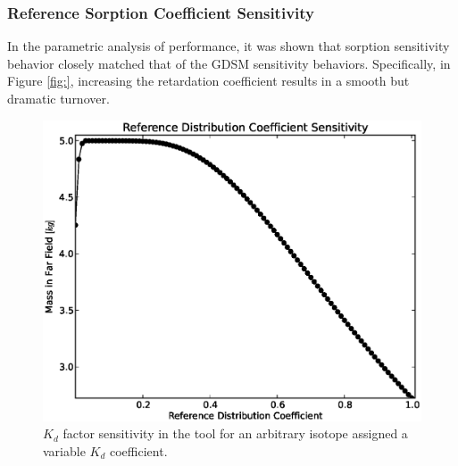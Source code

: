 
\subsubsection{Reference Sorption Coefficient Sensitivity}

In the parametric analysis of \Cyder performance, it was shown that sorption 
sensitivity behavior closely matched that of the \gls{GDSM} sensitivity 
behaviors. Specifically, in Figure \ref{fig:}, increasing the retardation 
coefficient results in a smooth but dramatic turnover. 

\begin{figure}[ht]
\centering
\includegraphics[width=0.7\linewidth]{./chapters/demonstration/bench/kd.eps}
\caption{$K_d$ factor sensitivity in the \Cyder tool for an arbitrary isotope 
assigned a variable $K_d$ coefficient.}
\label{fig:kd_result}
\end{figure}
